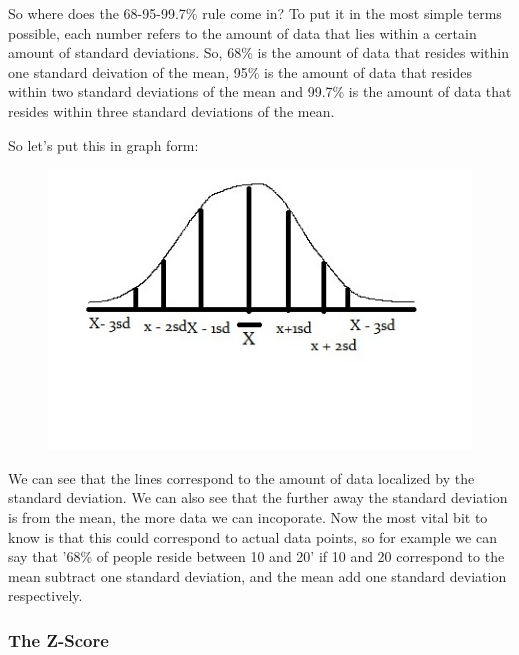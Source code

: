 \documentclass[11pt]{article}
\begin{document}
So where does the 68-95-99.7\% rule come in? To put it in the most simple terms possible, each number refers to the amount of data that lies within a certain amount of standard deviations. So, 68\% is the amount of data that resides within one standard deivation of the mean, 95\% is the amount of data that resides within two standard deviations of the mean and 99.7\% is the amount of data that resides within three standard deviations of the mean. 

So let's put this in graph form:

\clearpage{}
\begin{figure}[htp]
\centering
\includegraphics[scale=1.00]{BellCurve2Image10.jpg}
\end{figure}

We can see that the lines correspond to the amount of data localized by the standard deviation. We can also see that the further away the standard deviation is from the mean, the more data we can incoporate. Now the most vital bit to know is that this could correspond to actual data points, so for example we can say that '68\% of people reside between 10 and 20' if 10 and 20 correspond to the mean subtract one standard deviation, and the mean add one standard deviation respectively. 

\subsubsection*{The Z-Score}
\end{document}
